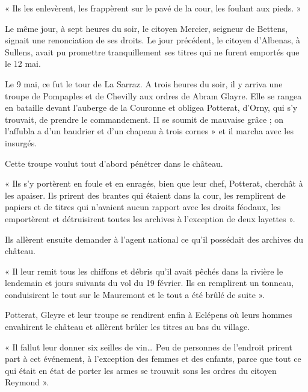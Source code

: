 \documentclass[french,twoside]{book} %
\newenvironment{quoteblock}%
  {\begin{quoting}}
  {\end{quoting}}
\newenvironment{quotebar}{%
    \def\FrameCommand{{\color{rubric!10!}\vrule width 0.5em} \hspace{0.9em}}%
    \def\OuterFrameSep{\itemsep} %
    \MakeFramed {\advance\hsize-\width \FrameRestore}
  }%
  {%
    \endMakeFramed
  }
\renewenvironment{quoteblock}%
  {%
    \savenotes
    \setstretch{0.9}
    \begin{quotebar}
  }
  {%
    \end{quotebar}
    \spewnotes
  }
\begin{document}
\begin{quoteblock}
\noindent « Ils les enlevèrent, les frappèrent sur le pavé de la cour, les foulant aux pieds. »\end{quoteblock}

\noindent Le même jour, à sept heures du soir, le citoyen Mercier, seigneur de Bettens, signait une renonciation de ses droits. Le jour précédent, le citoyen d’Albenas, à Sullens, avait pu promettre tranquillement ses titres qui ne furent emportés que le 12 mai.\par
Le 9 mai, ce fut le tour de La Sarraz. A trois heures du soir, il y arriva une troupe de Pompaples et de Chevilly aux ordres de Abram Glayre. Elle se rangea en bataille devant l’auberge de la Couronne et obligea Potterat, d’Orny, qui s’y trouvait, de prendre le commandement. II se soumit de mauvaise grâce ; on l’affubla a d’un baudrier et d’un chapeau à trois cornes » et il marcha avec les insurgés.\par
Cette troupe voulut tout d’abord pénétrer dans le château.\par

\begin{quoteblock}
 \noindent « Ils s’y portèrent en foule et en enragés, bien que leur chef, Potterat, cherchât à les apaiser. Ils prirent des brantes qui étaient dans la cour, les remplirent de papiers et de titres qui n’avaient aucun rapport avec les droits féodaux, les emportèrent et détruisirent toutes les archives à l’exception de deux layettes ».
 \end{quoteblock}

\noindent Ils allèrent ensuite demander à l’agent national ce qu’il possédait des archives du château.\par

\begin{quoteblock}
 \noindent « Il leur remit tous les chiffons et débris qu’il avait pêchés dans la rivière le lendemain et jours suivants du vol du 19 février. Ils en remplirent un tonneau, conduisirent le tout sur le Mauremont et le tout a été brûlé de suite ».
 \end{quoteblock}

\noindent Potterat, Gleyre et leur troupe se rendirent enfin à Eclépens où leurs hommes envahirent le château et allèrent brûler les titres au bas du village.\par

\begin{quoteblock}
 \noindent « Il fallut leur donner six seilles de vin… Peu de personnes de l’endroit prirent part à cet événement, à l’exception des femmes et des enfants, parce que tout ce qui était en état de porter les armes se trouvait sons les ordres du citoyen Reymond ».
 \end{quoteblock}
\end{document}
